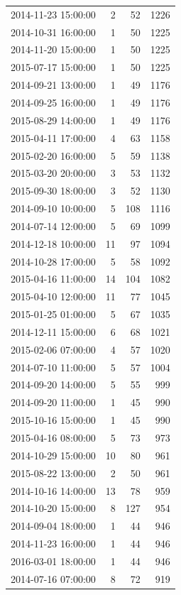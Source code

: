 \begin{tabular}{lrrr}
2014-11-23 15:00:00 & 2 & 52 & 1226 \\
2014-10-31 16:00:00 & 1 & 50 & 1225 \\
2014-11-20 15:00:00 & 1 & 50 & 1225 \\
2015-07-17 15:00:00 & 1 & 50 & 1225 \\
2014-09-21 13:00:00 & 1 & 49 & 1176 \\
2014-09-25 16:00:00 & 1 & 49 & 1176 \\
2015-08-29 14:00:00 & 1 & 49 & 1176 \\
2015-04-11 17:00:00 & 4 & 63 & 1158 \\
2015-02-20 16:00:00 & 5 & 59 & 1138 \\
2015-03-20 20:00:00 & 3 & 53 & 1132 \\
2015-09-30 18:00:00 & 3 & 52 & 1130 \\
2014-09-10 10:00:00 & 5 & 108 & 1116 \\
2014-07-14 12:00:00 & 5 & 69 & 1099 \\
2014-12-18 10:00:00 & 11 & 97 & 1094 \\
2014-10-28 17:00:00 & 5 & 58 & 1092 \\
2015-04-16 11:00:00 & 14 & 104 & 1082 \\
2015-04-10 12:00:00 & 11 & 77 & 1045 \\
2015-01-25 01:00:00 & 5 & 67 & 1035 \\
2014-12-11 15:00:00 & 6 & 68 & 1021 \\
2015-02-06 07:00:00 & 4 & 57 & 1020 \\
2014-07-10 11:00:00 & 5 & 57 & 1004 \\
2014-09-20 14:00:00 & 5 & 55 & 999 \\
2014-09-20 11:00:00 & 1 & 45 & 990 \\
2015-10-16 15:00:00 & 1 & 45 & 990 \\
2015-04-16 08:00:00 & 5 & 73 & 973 \\
2014-10-29 15:00:00 & 10 & 80 & 961 \\
2015-08-22 13:00:00 & 2 & 50 & 961 \\
2014-10-16 14:00:00 & 13 & 78 & 959 \\
2014-10-20 15:00:00 & 8 & 127 & 954 \\
2014-09-04 18:00:00 & 1 & 44 & 946 \\
2014-11-23 16:00:00 & 1 & 44 & 946 \\
2016-03-01 18:00:00 & 1 & 44 & 946 \\
2014-07-16 07:00:00 & 8 & 72 & 919 \\

\end{tabular}
